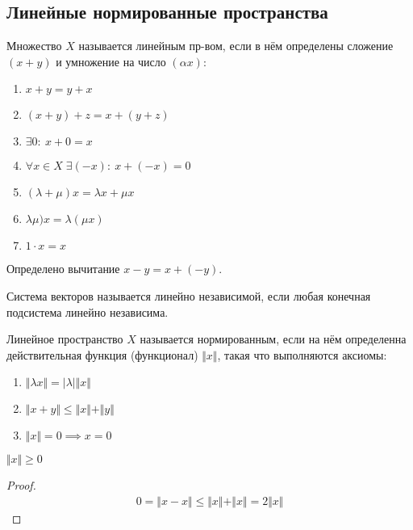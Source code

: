 \documentclass{article}
\begin{document}
\subsection{Линейные нормированные пространства}
\begin{definition}
  Множество $X$ называется линейным пр-вом,
  если в нём определены сложение $(x+y)$ и умножение на число $(\alpha x)$:
  \begin{enumerate}
    \item $x+y=y+x$
    \item $(x+y)+z=x+(y+z)$
    \item $\exists 0: \: x+0=x$
    \item $\forall x \in X \; \exists (-x): \: x+(-x)=0$
    \item $(\lambda+\mu)x=\lambda x+ \mu x$
    \item $\lambda \mu)x=\lambda(\mu x)$
    \item $1 \cdot x=x$
  \end{enumerate}
  Определено вычитание $x-y=x+(-y)$.
\end{definition}
\begin{definition}
  Система векторов называется линейно независимой, если
  любая конечная подсистема линейно независима.
\end{definition}
\begin{definition}
  Линейное пространство $X$ называется нормированным, если
  на нём определенна действительная функция (функционал) $\Vert x \Vert$,
  такая что выполняются аксиомы:
  \begin{enumerate}
    \item $\Vert \lambda x \Vert=|\lambda|\Vert x \Vert   $
    \item $\Vert x+y \Vert \le \Vert x \Vert + \Vert y \Vert$
    \item $\Vert x \Vert=0 \implies x=0$
  \end{enumerate}
\end{definition}
\begin{property}
  $\Vert x \Vert \ge 0$
\end{property}
\begin{proof}
  \begin{gather*}
    0 = \Vert x-x \Vert \le \Vert x \Vert+\Vert x \Vert = 2 \Vert x \Vert
  \end{gather*}
\end{proof}
\end{document}
